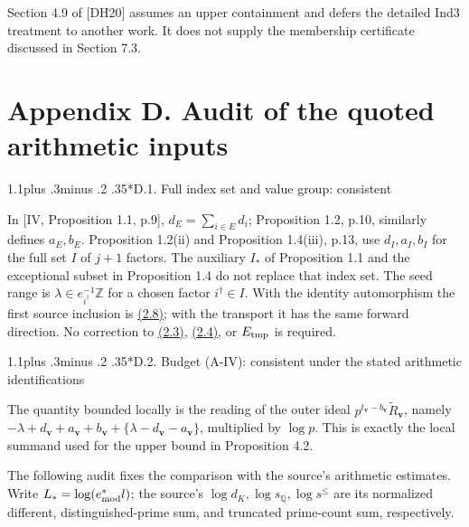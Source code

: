 \documentclass[11pt,a4paper]{amsart}
\makeatletter
\renewcommand\subsection{\@startsection{subsection}{2}{\z@}
{1.1\baselineskip plus .3\baselineskip minus .2\baselineskip}
{.35\baselineskip}{\normalfont\bfseries}}
\makeatother
\begin{document}
Section 4.9 of [DH20] assumes an upper containment and defers the detailed Ind3 treatment to another work. It does not supply the membership certificate discussed in Section 7.3.


\section*{Appendix D. Audit of the quoted arithmetic inputs}

\subsection*{D.1. Full index set and value group: consistent}

In [IV, Proposition 1.1, p.9], $d_E=\sum_{i\in E}d_i$; Proposition 1.2, p.10, similarly defines $a_E,b_E$. Proposition 1.2(ii) and Proposition 1.4(iii), p.13, use $d_I,a_I,b_I$ for the full set $I$ of $j+1$ factors. The auxiliary $I_*$ of Proposition 1.1 and the exceptional subset in Proposition 1.4 do not replace that index set. The seed range is $\lambda\in e_{i^\dagger}^{-1}\mathbb Z$ for a chosen factor $i^\dagger\in I$. With the identity automorphism the first source inclusion is \hyperref[eq:2.8]{(2.8)}; with the transport it has the same forward direction. No correction to \hyperref[eq:2.3]{(2.3)}, \hyperref[eq:2.4]{(2.4)}, or $E_{\rm tmp}$ is required.


\subsection*{D.2. Budget (A-IV): consistent under the stated arithmetic identifications}

The quantity bounded locally is the reading of the outer ideal $p^{t_{\mathbf v}-b_{\mathbf v}}\widetilde R_{\mathbf v}$, namely $-\lambda+d_{\mathbf v}+a_{\mathbf v}+b_{\mathbf v}+\{\lambda-d_{\mathbf v}-a_{\mathbf v}\}$, multiplied by $\log p$. This is exactly the local summand used for the upper bound in Proposition 4.2.


The following audit fixes the comparison with the source's arithmetic estimates. Write $L_*=\log(e^*_{\rm mod}l)$; the source's $\log d_K,\log s_{\mathbb Q},\log s^{\le}$ are its normalized different, distinguished-prime sum, and truncated prime-count sum, respectively.
\end{document}
